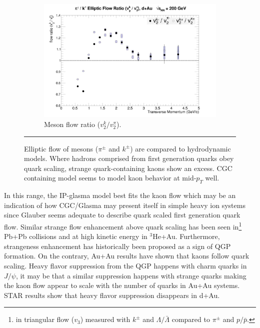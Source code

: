 \begin{figure}[hbtp]
\begin{subfigure}[h]{0.48\textwidth}
	\end{subfigure}
	\begin{subfigure}[h]{0.48\textwidth}
    \centering
    \includegraphics[width=1\textwidth]{results/v2mesonratio.jpg}
    \caption{Meson flow ratio ($v_2^{k} / v_2^{\pi}$).}
    \label{fig:mesonratio}

	\end{subfigure}

    \rule{35em}{0.5pt}
    \caption[Meson Elliptic Flow plots]{Elliptic flow of mesons ($\pi^{\pm}$ and $k^{\pm}$) are compared to hydrodynamic models. Where hadrons comprised from first generation quarks obey quark scaling, strange quark-containing kaons show an excess. CGC containing model seems to model kaon behavior at mid-$p_T$ well.}
    \label{fig:qscaledhydro}
\end{figure}

In this range, the IP-glasma model best fits the kaon flow which may be an indication of how CGC/Glasma may present itself in simple heavy ion systems since Glauber seems adequate to describe quark scaled first generation quark flow. Similar strange flow enhancement above quark scaling has been seen in\footnote{in triangular flow ($v_3$) measured with $k^{\pm}$ and $\Lambda/\bar{\Lambda}$ compared to $\pi^{\pm}$ and $p/\bar{p}$.} Pb+Pb collisions\citep{1742-6596-668-1-012099} and at high kinetic energy in $^3$He+Au\citep{huangQM2015}. Furthermore, strangeness enhancement has historically been proposed as a sign of QGP formation\citep{PhysRevLett.48.1066}. On the contrary, Au+Au results have shown that kaons follow quark scaling. Heavy flavor suppression from the QGP happens with charm quarks in $J/\psi$, it may be that a similar suppression happens with strange quarks making the kaon flow appear to scale with the number of quarks in Au+Au systems. STAR results show that heavy flavor suppression disappears in d+Au\citep{Powell:2010oea}.  

